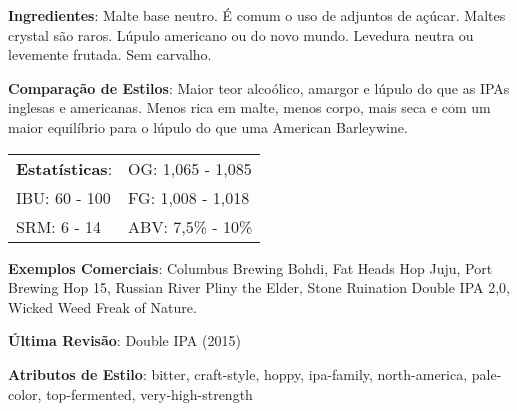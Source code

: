 \textbf{Ingredientes}: Malte base neutro. É comum o uso de adjuntos de açúcar. Maltes crystal são raros. Lúpulo americano ou do novo mundo. Levedura neutra ou levemente frutada. Sem carvalho.

\textbf{Comparação de Estilos}: Maior teor alcoólico, amargor e lúpulo do que as IPAs inglesas e americanas. Menos rica em malte, menos corpo, mais seca e com um maior equilíbrio para o lúpulo do que uma American Barleywine.

\begin{tabular}{@{}p{35mm}p{35mm}@{}}
  \textbf{Estatísticas}: & OG: 1,065 - 1,085  \\
  IBU: 60 - 100  & FG: 1,008 - 1,018   \\
  SRM: 6 - 14 & ABV: 7,5\% - 10\%
\end{tabular}

\textbf{Exemplos Comerciais}: Columbus Brewing Bohdi, Fat Heads Hop Juju, Port Brewing Hop 15, Russian River Pliny the Elder, Stone Ruination Double IPA 2,0, Wicked Weed Freak of Nature.

\textbf{Última Revisão}: Double IPA (2015)

\textbf{Atributos de Estilo}: bitter, craft-style, hoppy, ipa-family, north-america, pale-color, top-fermented, very-high-strength
